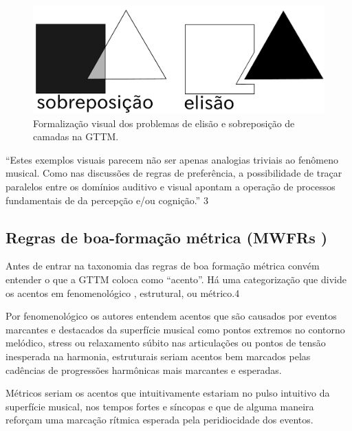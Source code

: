 \documentclass[
	12pt,				%
	openright,			%
	twoside,			%
	a4paper,			%
	english,			%
	french,				%
	spanish,			%
	brazil				%
	]{abntex2}
\begin{document}
\begin{figure}[htb]
	\caption{\label{fig_grafico}Formalização visual dos problemas de elisão e sobreposição de camadas na GTTM. \cite[ p.69]{lerdahl1983generative}}
	\begin{center}
	    \includegraphics[scale=0.25]{gestalt/gestalt_elision_overlay.pdf}
	\end{center}
\end{figure}



“Estes exemplos visuais parecem não ser apenas analogias triviais ao fenômeno musical. Como nas discussões de regras de preferência, a possibilidade de traçar paralelos entre os domínios auditivo e visual apontam a operação de processos fundamentais de da percepção e/ou cognição.” \cite{lerdahl1983generative} 3

\subsection{Regras de boa-formação métrica (MWFRs )}

Antes de entrar na taxonomia das regras de boa formação métrica convém entender o que a GTTM coloca como “acento”. Há uma categorização que divide os acentos em fenomenológico , estrutural, ou métrico.4 

Por fenomenológico os autores entendem acentos que são causados por eventos marcantes e destacados da superfície musical como pontos extremos no contorno melódico, stress ou relaxamento súbito nas articulações ou pontos de tensão inesperada na harmonia, estruturais seriam acentos bem marcados pelas cadências de progressões harmônicas mais marcantes e esperadas.

Métricos seriam os acentos que intuitivamente estariam no pulso intuitivo da superfície musical, nos tempos fortes e síncopas e que de alguma maneira reforçam uma marcação rítmica esperada pela peridiocidade dos eventos. 
\end{document}
